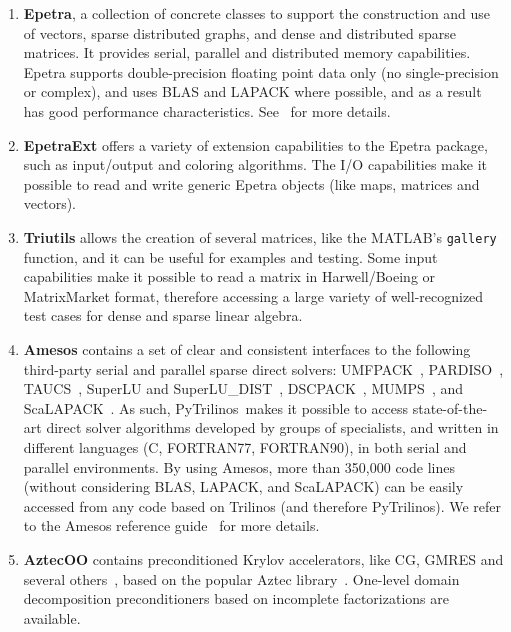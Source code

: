 \documentclass[10pt,relax]{SANDreport}
\newcommand{\PyTrilinos}{{PyTrilinos}}
\begin{document}
\begin{enumerate}

\item {\bf Epetra}, a collection of concrete classes to support the
construction and use of vectors, sparse distributed graphs, and dense and
distributed sparse matrices. It provides serial, parallel and distributed
memory capabilities. Epetra supports double-precision floating point data only
(no single-precision or complex), and uses BLAS and LAPACK where possible, and
as a result has good performance characteristics.  See~\cite{epetra-guide} for
more details. 
\item {\bf EpetraExt} offers a variety of extension capabilities to
  the Epetra package, such as input/output and coloring algorithms.
  The I/O capabilities make it possible to read and write generic
  Epetra objects (like maps, matrices and vectors).

\item {\bf Triutils} allows the creation of several matrices, like the
  MATLAB's {\tt gallery} function, and it can be useful for examples
  and testing. Some input capabilities make it possible to read a matrix in
  Harwell/Boeing or MatrixMarket format, therefore accessing a large variety
  of well-recognized test cases for dense and sparse linear algebra.

\item {\bf Amesos} contains a set of clear and consistent interfaces
  to the following third-party serial and parallel sparse direct
  solvers: UMFPACK~\cite{umfpack-acm-toms},
  PARDISO~\cite{oskl:04-etna,sg:04-fgcs}, TAUCS~\cite{taucs-home-page}, SuperLU
  and SuperLU\_DIST~\cite{superlu-manual},
  DSCPACK~\cite{dscpack-manual}, MUMPS~\cite{mumps-manual}, and
  ScaLAPACK~\cite{scalapack-book,scalapack}. As
  such, \PyTrilinos\ makes it possible to access state-of-the-art
  direct solver algorithms developed by groups of specialists, and
  written in different languages (C, FORTRAN77, FORTRAN90), in both
  serial and parallel environments. By using Amesos, more than 350,000 code lines (without
  considering BLAS, LAPACK, and ScaLAPACK) can be easily accessed from any
  code based on Trilinos (and therefore PyTrilinos).  We refer to the Amesos
  reference guide~\cite{Amesos-Reference-Guide} for more details.

\item {\bf AztecOO} contains preconditioned Krylov accelerators, like
  CG, GMRES and several others~\cite{golub96matrix}, based on the popular Aztec
  library~\cite{aztecoo-guide}.  One-level domain decomposition
  preconditioners based on incomplete factorizations are available.


\end{enumerate}
\end{document}
